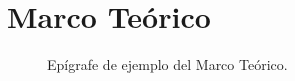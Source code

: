   \section{Marco Teórico}
    
    \begin{figure}[ht]
      \centering
      \caption{Epígrafe de ejemplo del Marco Teórico.}
      \label{fig:MarcTeoImage}
  \end{figure}

